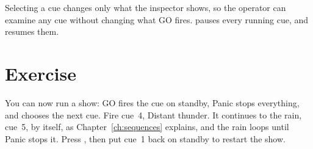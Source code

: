 Selecting a cue changes only what the inspector shows, so the operator can
examine any cue without changing what GO fires.   pauses every
running cue, and  resumes them.

\section*{Exercise}

You can now run a show: GO fires the cue on standby, Panic stops everything,
and  chooses the next cue.  Fire cue~4, Distant thunder.
It continues to the rain, cue~5, by itself, as Chapter~\ref{ch:sequences}
explains, and the rain loops until Panic stops it.  Press , then
put cue~1 back on standby to restart the show.
